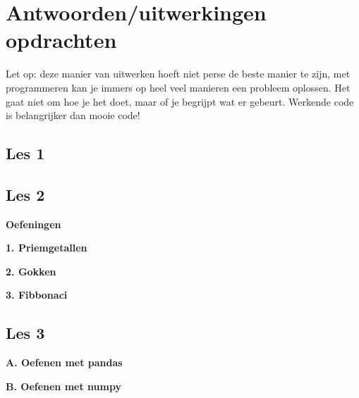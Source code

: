 \chapter{Antwoorden/uitwerkingen opdrachten}
Let op: deze manier van uitwerken hoeft niet perse de beste manier te zijn, met programmeren kan je immers op heel veel manieren een probleem oplossen. Het gaat niet om hoe je het doet, maar of je begrijpt wat er gebeurt. Werkende code is belangrijker dan mooie code!

\section{Les 1}





\section{Les 2}
\textbf{Oefeningen}




\textbf{1. Priemgetallen}


\textbf{2. Gokken}


\textbf{3. Fibbonaci}


\section{Les 3}
\textbf{A. Oefenen met pandas}

\textbf{B. Oefenen met numpy}

